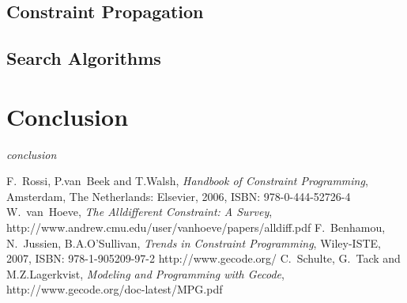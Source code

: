\documentclass[10pt,
               a4paper,
               journal,
               ]{IEEEtran}
\begin{document}
	\subsection{Constraint Propagation}
	
	\subsection{Search Algorithms}
	
	\section{Conclusion}
	\textit{conclusion}
	
	\begin{thebibliography}{1}
		F.~Rossi, P.van~Beek and T.Walsh, \emph{Handbook of Constraint Programming}, Amsterdam, The Netherlands: Elsevier, 2006, ISBN: 978-0-444-52726-4
		W.~van~Hoeve, \emph{The Alldifferent Constraint: A Survey}, http://www.andrew.cmu.edu/user/vanhoeve/papers/alldiff.pdf
		F.~Benhamou, N.~Jussien, B.A.O'Sullivan, \emph{Trends in Constraint Programming}, Wiley-ISTE, 2007, ISBN: 978-1-905209-97-2
		http://www.gecode.org/
		C.~Schulte, G.~Tack and M.Z.Lagerkvist, \emph{Modeling and Programming with Gecode}, http://www.gecode.org/doc-latest/MPG.pdf
	\end{thebibliography}
\end{document}

